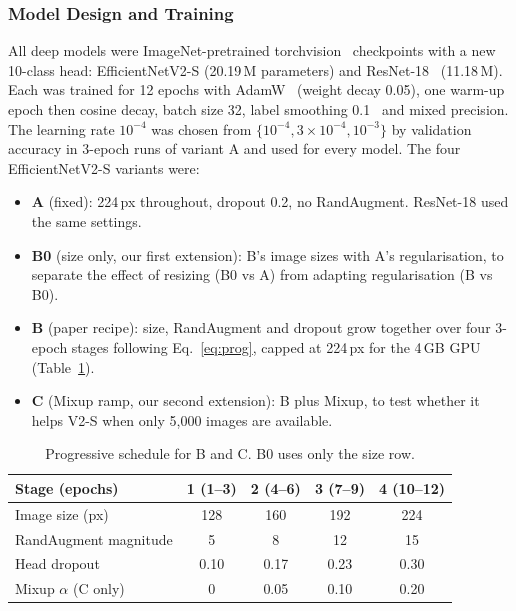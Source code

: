 \documentclass[10pt,twocolumn]{article}
\begin{document}
\subsubsection{Model Design and Training}
All deep models were ImageNet-pretrained torchvision~\cite{torchvision2016} checkpoints with a new
10-class head: EfficientNetV2-S (20.19\,M parameters) and ResNet-18~\cite{he2016deep} (11.18\,M). Each
was trained for 12 epochs with AdamW~\cite{loshchilov2019decoupled} (weight decay 0.05), one warm-up
epoch then cosine decay, batch size 32, label smoothing 0.1~\cite{szegedy2016rethinking} and mixed
precision. The learning rate $10^{-4}$ was chosen from $\{10^{-4}, 3{\times}10^{-4}, 10^{-3}\}$ by
validation accuracy in 3-epoch runs of variant A and used for every model. The four EfficientNetV2-S
variants were:
\begin{itemize}
\item \textbf{A} (fixed): 224\,px throughout, dropout 0.2, no RandAugment. ResNet-18 used the same settings.
\item \textbf{B0} (size only, our first extension): B's image sizes with A's regularisation, to separate
the effect of resizing (B0 vs A) from adapting regularisation (B vs B0).
\item \textbf{B} (paper recipe): size, RandAugment and dropout grow together over four 3-epoch stages
following Eq.~\eqref{eq:prog}, capped at 224\,px for the 4\,GB GPU (Table~\ref{tab:sched}).
\item \textbf{C} (Mixup ramp, our second extension): B plus Mixup, to test whether it helps V2-S when
only 5{,}000 images are available.
\end{itemize}

\begin{table}[t]
\centering\footnotesize
\begin{tabular}{@{}lcccc@{}}
\toprule
Stage (epochs) & 1 (1--3) & 2 (4--6) & 3 (7--9) & 4 (10--12) \\
\midrule
Image size (px) & 128 & 160 & 192 & 224 \\
RandAugment magnitude & 5 & 8 & 12 & 15 \\
Head dropout & 0.10 & 0.17 & 0.23 & 0.30 \\
Mixup $\alpha$ (C only) & 0 & 0.05 & 0.10 & 0.20 \\
\bottomrule
\end{tabular}
\caption{Progressive schedule for B and C. B0 uses only the size row.}
\label{tab:sched}
\end{table}
\end{document}
